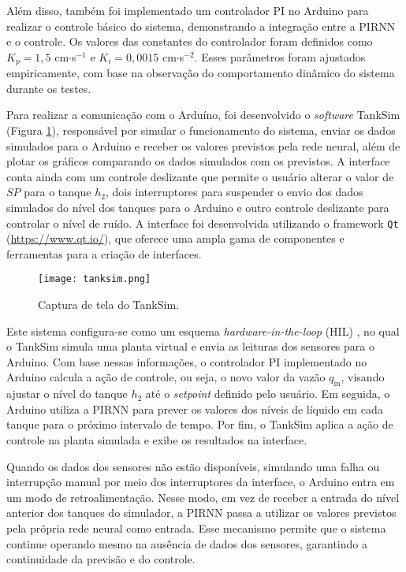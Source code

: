 Além disso, também foi implementado um controlador PI no Arduino para realizar o controle básico do sistema, demonstrando a integração entre a PIRNN e o controle. Os valores das constantes do controlador foram definidos como $K_p = 1,5$ cm$\cdot$s$^{-1}$ e $K_i = 0,0015$ cm$\cdot$s$^{-2}$. Esses parâmetros foram ajustados empiricamente, com base na observação do comportamento dinâmico do sistema durante os testes.

Para realizar a comunicação com o Arduíno, foi desenvolvido o \textit{software} TankSim (Figura \ref{fig:interface}), responsável por simular o funcionamento do sistema, enviar os dados simulados para o Arduino e receber os valores previstos pela rede neural, além de plotar os gráficos comparando os dados simulados com os previstos. A interface conta ainda com um controle deslizante que permite o usuário alterar o valor de $SP$ para o tanque $h_2$, dois interruptores para suspender o envio dos dados simulados do nível dos tanques para o Arduino e outro controle deslizante para controlar o nível de ruído. A interface foi desenvolvida utilizando o framework \texttt{Qt} (\url{https://www.qt.io/}), que oferece uma ampla gama de componentes e ferramentas para a criação de interfaces.

\begin{figure}[ht]
  \centering
  \texttt{[image: tanksim.png]}
  \caption{Captura de tela do TankSim.}
  \label{fig:interface}
\end{figure}

Este sistema configura-se como um esquema \textit{hardware-in-the-loop} (HIL) \citep{bacic_2005}, no qual o TankSim simula uma planta virtual e envia as leituras dos sensores para o Arduino. Com base nessas informações, o controlador PI implementado no Arduino calcula a ação de controle, ou seja, o novo valor da vazão $q_{\mathrm{in}}$, visando ajustar o nível do tanque $h_2$ até o \textit{setpoint} definido pelo usuário. Em seguida, o Arduino utiliza a PIRNN para prever os valores dos níveis de líquido em cada tanque para o próximo intervalo de tempo. Por fim, o TankSim aplica a ação de controle na planta simulada e exibe os resultados na interface.

Quando os dados dos sensores não estão disponíveis, simulando uma falha ou interrupção manual por meio dos interruptores da interface, o Arduino entra em um modo de retroalimentação. Nesse modo, em vez de receber a entrada do nível anterior dos tanques do simulador, a PIRNN passa a utilizar os valores previstos pela própria rede neural como entrada. Esse mecanismo permite que o sistema continue operando mesmo na ausência de dados dos sensores, garantindo a continuidade da previsão e do controle.
